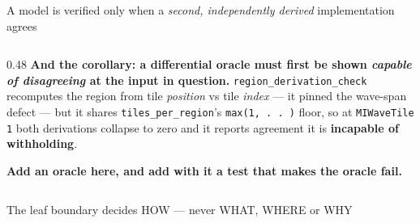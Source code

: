 \documentclass[aspectratio=169,9pt]{beamer}
\newcommand{\key}[1]{\textcolor{acc}{\textbf{#1}}}
\newcommand{\bad}[1]{\textcolor{warn}{\textbf{#1}}}
\newcommand{\good}[1]{\textcolor{ok}{\textbf{#1}}}
\begin{document}
\begin{frame}{A model is verified only when a \emph{second, independently derived} implementation agrees}
\begin{columns}[T]
\begin{column}{0.48\textwidth}
\medskip
\key{And the corollary: a differential oracle must first be shown \emph{capable of disagreeing} at
the input in question.} \texttt{region\_derivation\_check} recomputes the region from tile
\emph{position} vs tile \emph{index} --- it pinned the wave-span defect --- but it shares
\texttt{tiles\_per\_region}'s \texttt{max(1,\,.\,.\,)} floor, so at \texttt{MIWaveTile 1} both
derivations collapse to zero and it reports agreement it is \bad{incapable of withholding}.

\smallskip
\good{Add an oracle here, and add with it a test that makes the oracle fail.}
\end{column}
\end{columns}
\end{frame}

\begin{frame}{The leaf boundary decides HOW --- never WHAT, WHERE or WHY}
\centering
{}


\end{frame}
\end{document}
